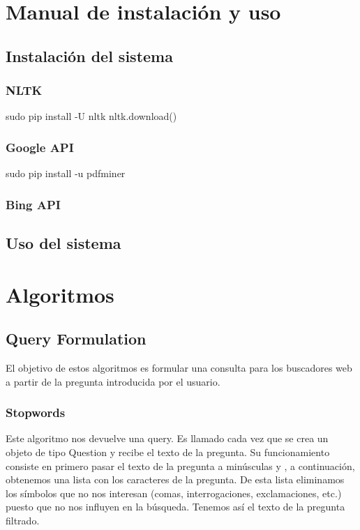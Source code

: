 \documentclass[12pt,a4paper,titlepage]{article}
\begin{document}
\clearpage
\section{Manual de instalación y uso}

\subsection{Instalación del sistema}

\subsubsection{NLTK}
sudo pip install -U nltk
nltk.download()

\subsubsection{Google API}

sudo pip install -u pdfminer

\subsubsection{Bing API}



\subsection{Uso del sistema}



\clearpage
\section{Algoritmos}
\subsection{Query Formulation}
El objetivo de estos algoritmos es formular una consulta para los buscadores web a partir de la pregunta introducida por el usuario.

\subsubsection{Stopwords}
Este algoritmo nos devuelve una query. Es llamado cada vez que se crea un objeto de tipo Question y recibe el texto de la pregunta. Su funcionamiento consiste en primero pasar el texto de la pregunta a minúsculas y , a continuación, obtenemos una lista con los caracteres de la pregunta. De esta lista eliminamos los símbolos que no nos interesan (comas, interrogaciones, exclamaciones, etc.) puesto que no nos influyen en la búsqueda. Tenemos así el texto de la pregunta filtrado.
\end{document}
